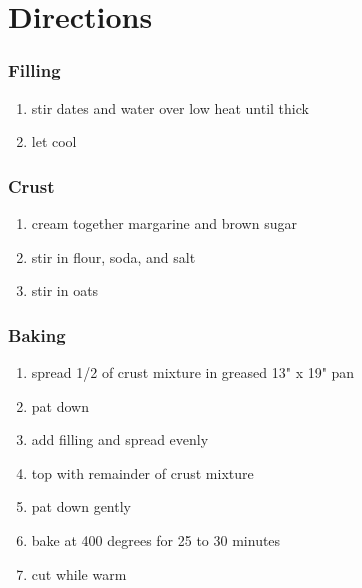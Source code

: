 \documentclass[notitlepage,12pt]{report}
\providecommand{\tightlist}{%
  \setlength{\itemsep}{0pt}\setlength{\parskip}{0pt}}
\begin{document}
\begin{minipage}[t]{0.6\textwidth}\vspace{0pt}


\hypertarget{directions}{%
\section*{Directions}\label{directions}}

\hypertarget{filling}{%
\subsubsection{Filling}\label{filling}}

\begin{enumerate}[leftmargin=*]
\def\labelenumi{\arabic{enumi}.}
\tightlist
\item
  stir dates and water over low heat until thick
\item
  let cool
\end{enumerate}

\hypertarget{crust}{%
\subsubsection{Crust}\label{crust}}

\begin{enumerate}[leftmargin=*]
\def\labelenumi{\arabic{enumi}.}
\tightlist
\item
  cream together margarine and brown sugar
\item
  stir in flour, soda, and salt
\item
  stir in oats
\end{enumerate}

\hypertarget{baking}{%
\subsubsection{Baking}\label{baking}}

\begin{enumerate}[leftmargin=*]
\def\labelenumi{\arabic{enumi}.}
\tightlist
\item
  spread 1/2 of crust mixture in greased 13" x 19" pan
\item
  pat down
\item
  add filling and spread evenly
\item
  top with remainder of crust mixture
\item
  pat down gently
\item
  bake at 400 degrees for 25 to 30 minutes
\item
  cut while warm
\end{enumerate}




\end{minipage}%
\end{document}
